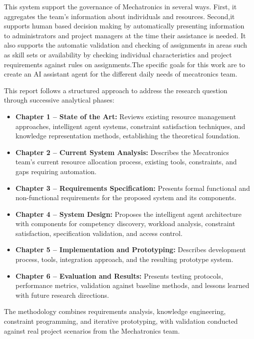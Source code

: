 \vspace{0.3cm}

This system support the governance of Mechatronics in several ways. First, it aggregates the team's information about individuals and resources. Second,it supports human based decision making by automatically presenting information to administrators and project managers at the time their assistance is needed. It also supports the automatic validation and checking of assignments in areas such as skill sets or availability by checking individual characteristics and project requirements against rules on assignments.The specific goals for this work are to create an AI assistant agent for the different daily needs of mecatronics team.

\vspace{0.3cm}
This report follows a structured approach to address the research question through successive analytical phases:

\begin{itemize}
  \item \textbf{Chapter 1 -- State of the Art:} Reviews existing resource management approaches, intelligent agent systems, constraint satisfaction techniques, and knowledge representation methods, establishing the theoretical foundation.
  
  \item \textbf{Chapter 2 -- Current System Analysis:} Describes the Mecatronics team's current resource allocation process, existing tools, constraints, and gaps requiring automation.
  
  \item \textbf{Chapter 3 -- Requirements Specification:} Presents formal functional and non-functional requirements for the proposed system and its components.
  
  \item \textbf{Chapter 4 -- System Design:} Proposes the intelligent agent architecture with components for competency discovery, workload analysis, constraint satisfaction, specification validation, and access control.
  
  \item \textbf{Chapter 5 -- Implementation and Prototyping:} Describes development process, tools, integration approach, and the resulting prototype system.
  
  \item \textbf{Chapter 6 -- Evaluation and Results:} Presents testing protocols, performance metrics, validation against baseline methods, and lessons learned with future research directions.
\end{itemize}

The methodology combines requirements analysis, knowledge engineering, constraint programming, and iterative prototyping, with validation conducted against real project scenarios from the Mechatronics team.
